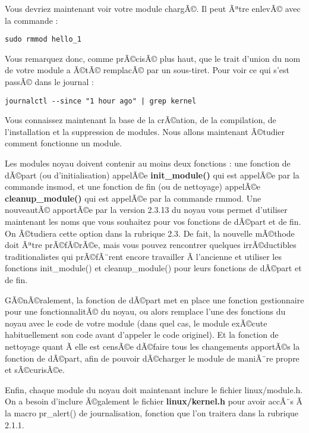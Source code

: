 \documentclass[11pt]{article}
\begin{document}
Vous devriez maintenant voir votre module chargÃ©. Il peut Ãªtre enlevÃ© avec la commande :

\begin{verbatim}
sudo rmmod hello_1
\end{verbatim}

Vous remarquez donc, comme prÃ©cisÃ© plus haut, que le trait d'union du nom de votre module a Ã©tÃ© remplacÃ© par un sous-tiret. Pour voir ce qui s'est passÃ© dans le journal :

\begin{verbatim}
journalctl --since "1 hour ago" | grep kernel
\end{verbatim}

Vous connaissez maintenant la base de la crÃ©ation, de la compilation, de l'installation et la suppression de modules. Nous allons maintenant Ã©tudier comment fonctionne un module.

Les modules noyau doivent contenir au moins deux fonctions : une fonction de dÃ©part (ou d'initialisation) appelÃ©e \textbf{init\_module()} qui est appelÃ©e par la commande insmod, et une fonction de fin (ou de nettoyage) appelÃ©e \textbf{cleanup\_module()} qui est appelÃ©e par la commande rmmod. Une nouveautÃ© apportÃ©e par la version 2.3.13 du noyau vous permet d'utiliser maintenant les noms que vous souhaitez pour vos fonctions de dÃ©part et de fin. On Ã©tudiera cette option dans la rubrique 2.3. De fait, la nouvelle mÃ©thode doit Ãªtre prÃ©fÃ©rÃ©e, mais vous pouvez rencontrer quelques irrÃ©ductibles traditionalistes qui prÃ©fÃ¨rent encore travailler Ã  l'ancienne et utiliser les fonctions init\_module() et cleanup\_module() pour leurs fonctions de dÃ©part et de fin.

GÃ©nÃ©ralement, la fonction de dÃ©part met en place une fonction gestionnaire pour une fonctionnalitÃ© du noyau, ou alors remplace l'une des fonctions du noyau avec le code de votre module (dans quel cas, le module exÃ©cute habituellement son code avant d'appeler le code originel). Et la fonction de nettoyage quant Ã  elle est censÃ©e dÃ©faire tous les changements apportÃ©s la fonction de dÃ©part, afin de pouvoir dÃ©charger le module de maniÃ¨re propre et sÃ©curisÃ©e.

Enfin, chaque module du noyau doit maintenant inclure le fichier linux/module.h. On a besoin d'inclure Ã©galement le fichier \textbf{linux/kernel.h} pour avoir accÃ¨s Ã  la macro pr\_alert() de journalisation, fonction que l'on traitera dans la rubrique 2.1.1.
\end{document}
